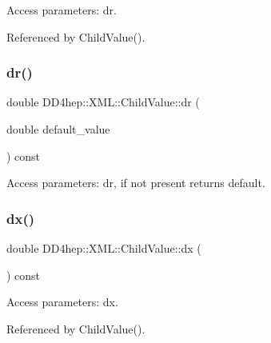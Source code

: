 Access parameters\+: dr. 



Referenced by Child\+Value().

\hypertarget{struct_d_d4hep_1_1_x_m_l_1_1_child_value_a19c591783fa43f70a4e4de2b3db5682a}{}\label{struct_d_d4hep_1_1_x_m_l_1_1_child_value_a19c591783fa43f70a4e4de2b3db5682a} 
\subsubsection{\texorpdfstring{dr()}{dr()}\hspace{0.1cm}{\footnotesize\ttfamily [2/2]}}
{\footnotesize\ttfamily double D\+D4hep\+::\+X\+M\+L\+::\+Child\+Value\+::dr (\begin{DoxyParamCaption}\item[{double}]{default\+\_\+value }\end{DoxyParamCaption}) const}



Access parameters\+: dr, if not present returns default. 

\hypertarget{struct_d_d4hep_1_1_x_m_l_1_1_child_value_ae70f83d9a264ebd606622e5dd6ccc133}{}\label{struct_d_d4hep_1_1_x_m_l_1_1_child_value_ae70f83d9a264ebd606622e5dd6ccc133} 
\subsubsection{\texorpdfstring{dx()}{dx()}\hspace{0.1cm}{\footnotesize\ttfamily [1/2]}}
{\footnotesize\ttfamily double D\+D4hep\+::\+X\+M\+L\+::\+Child\+Value\+::dx (\begin{DoxyParamCaption}{ }\end{DoxyParamCaption}) const}



Access parameters\+: dx. 



Referenced by Child\+Value().

\hypertarget{struct_d_d4hep_1_1_x_m_l_1_1_child_value_a7500cb2eae5f90ee2f28608a75dc1789}{}\label{struct_d_d4hep_1_1_x_m_l_1_1_child_value_a7500cb2eae5f90ee2f28608a75dc1789} 
